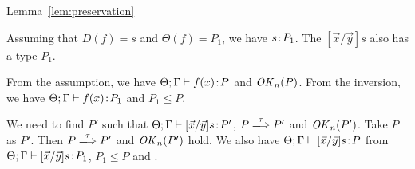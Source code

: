 \begin{pfof}{Lemma~\ref{lem:preservation}}
\begin{itemize}
  Assuming that \(D(f) = s\) and \(\Theta(f) = P_1\), we have \(s\!:\!
  P_1\). The \([\vec{x}/\vec{y}]s\) also has a type \(P_1\).

  From the assumption, we have \(\Theta;\Gamma \vdash f(x)\!:\! P\) and
  \(\mathit{OK}_n(P)\). From the inversion, we have \(\Theta;\Gamma \vdash
  f(x)\!:\! P_1\) and \(P_1 \le P\).

  We need to find \(P'\) such that \(\Theta;\Gamma \vdash [\vec{x}/\vec{y}]s\!:\!
  P'\), \(P \xLongrightarrow{\tau} P'\) and \(\mathit{OK}_n(P')\). Take \(P\) as
  \(P'\). Then \(P \xLongrightarrow{\tau} P'\) and \(\mathit{OK}_n(P')\) hold. We
  also have \(\Theta;\Gamma \vdash [\vec{x}/\vec{y}]s\!:\! P \) from
  \(\Theta;\Gamma \vdash [\vec{x}/\vec{y}]s\!:\! P_1\), \(P_1 \le P\) and
  .

\end{itemize}

\end{pfof}

